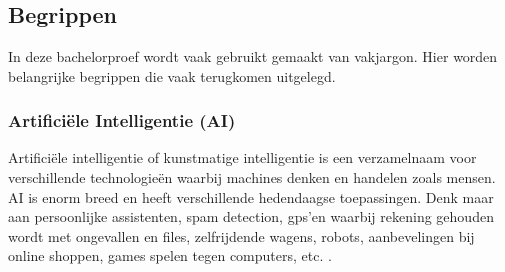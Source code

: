 
\chapter{}
\label{ch:inleiding}

%

\section{Begrippen}
\label{sec:begrippen}

In deze bachelorproef wordt vaak gebruikt gemaakt van vakjargon. Hier worden belangrijke begrippen die vaak terugkomen uitgelegd.

\subsection{Artificiële Intelligentie (AI)}
\label{subsec:begrippen-ai}

Artificiële intelligentie of kunstmatige intelligentie is een verzamelnaam voor verschillende technologieën waarbij machines denken en handelen zoals mensen. AI is enorm breed en heeft verschillende hedendaagse toepassingen. Denk maar aan persoonlijke assistenten, spam detection, gps’en waarbij rekening gehouden wordt met ongevallen en files, zelfrijdende wagens, robots, aanbevelingen bij online shoppen, games spelen tegen computers, etc. \autocite{Fagella2020}.

